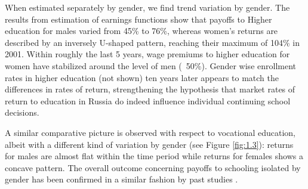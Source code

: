 \documentclass[12pt,a4paper]{article}
\numberwithin{equation}{section}
\begin{document}
When estimated separately by gender, we find trend variation by gender. The results from estimation of earnings functions show that payoffs to Higher education for males varied from 45\% to 76\%, whereas women's returns are described by an inversely U-shaped pattern, reaching their maximum of 104\% in 2001. Within roughly the last 5 years, wage premiums to higher education for women have stabilized around the level of men (~50\%).  Gender wise enrollment rates in higher education (not shown) ten years later appears to match the differences in rates of return, strengthening the hypothesis that market rates of return to education in Russia do indeed influence individual continuing school decisions. 

A similar comparative picture is observed with respect to vocational education, albeit with a different kind of variation by gender (see Figure \ref{fig:1.3}): returns for males are almost flat within the time period while returns for females shows a concave pattern. The overall outcome concerning payoffs to schooling isolated by gender has been confirmed in a similar fashion by past studies \parencite[e.g.,][]{cheidvasser_006._2007}.
\end{document}
